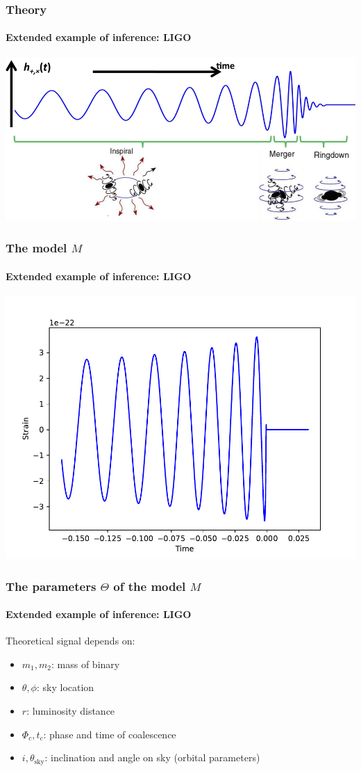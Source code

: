 \documentclass[%
]{beamer}
\begin{document}
\begin{frame}
    \frametitle{Theory}
    \framesubtitle{Extended example of inference: LIGO}
    \includegraphics[width=\textwidth]{./figures/ligo_schematic.png}
\end{frame}

\begin{frame}
    \frametitle{The model $M$}
    \framesubtitle{Extended example of inference: LIGO}
    \includegraphics[width=\textwidth]{./figures/ligo_model.pdf}
\end{frame}

\begin{frame}
    \frametitle{The parameters $\Theta$ of the model $M$}
    \framesubtitle{Extended example of inference: LIGO}
    Theoretical signal depends on:
    \begin{itemize}
        \pause\item $m_1, m_2$: mass of binary
        \pause\item $\theta, \phi$: sky location
        \pause\item $r$: luminosity distance 
        \pause\item $\Phi_c, t_c$: phase and time of coalescence
        \pause\item $i, \theta_\mathrm{sky}$: inclination and angle on sky (orbital parameters)
    \end{itemize}
\end{frame}
\end{document}
